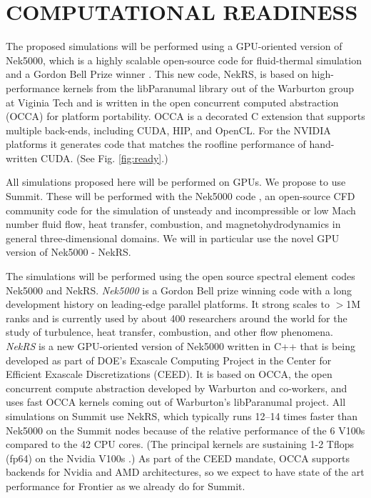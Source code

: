\newpage
\vspace{-.25in}
\section{COMPUTATIONAL READINESS} %
\vspace{-.2in}

The proposed simulations will be performed using a GPU-oriented version of 
Nek5000, which is a highly scalable open-source code for fluid-thermal 
simulation and a Gordon Bell Prize winner \cite{tufo99}.  This new code,
NekRS, is based on high-performance kernels from the libParanumal library
out of the Warburton group at Viginia Tech and is written in the open
concurrent computed abstraction (OCCA) for platform portability.  OCCA
is a decorated C extension that supports multiple back-ends, including CUDA,
HIP, and OpenCL.  For the NVIDIA platforms it generates code that matches
the roofline performance of hand-written CUDA. (See Fig. \ref{fig:ready}.)

All simulations proposed here will be performed on GPUs. We propose to use
Summit.  These will be performed with the Nek5000 code
\cite{argonne:nekdoc}, an open-source CFD  community code for the simulation of
unsteady and incompressible or low Mach number fluid flow, heat transfer,
combustion, and magnetohydrodynamics in general three-dimensional domains. We
will in particular use the novel GPU version of Nek5000 - NekRS.

The simulations will be performed using the open source spectral element codes
Nek5000 and NekRS.   {\em Nek5000} is a Gordon Bell prize winning code with a
long development history on leading-edge parallel platforms.  It strong scales
to $>$1M ranks \cite{fischer15} and is currently used by about 400 researchers
around the world for the study of turbulence, heat transfer, combustion, and
other flow phenomena.  {\em NekRS} is a new GPU-oriented version of Nek5000
written in C++ that is being developed as part of DOE's Exascale Computing
Project in the Center for Efficient Exascale Discretizations (CEED).  It is
based on OCCA, the open concurrent compute abstraction developed by Warburton
and co-workers, and uses fast OCCA kernels coming out of Warburton's
libParanumal project.  All simulations on Summit use NekRS, which typically
runs 12--14 times faster than Nek5000 on the Summit nodes because of the
relative performance of the 6 V100s compared to the 42 CPU cores.  (The
principal kernels are sustaining 1-2 Tflops (fp64) on the Nvidia V100s
\cite{fischer20a,warburton2019}.) As part of the CEED mandate, OCCA supports
backends for Nvidia and AMD architectures, so we expect to have state of the
art performance for Frontier as we already do for Summit.

